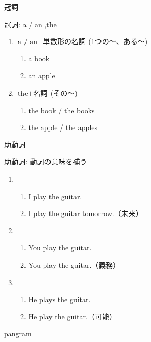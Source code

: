 \documentclass[aspectratio=169,xcolor={dvipsnames,table}]{beamer}
\begin{document}
\begin{frame}[plain]{冠詞}
\Large

冠詞: a / an ,\hspace{10pt}the

 \begin{enumerate}
  \item $\text{a / an} + \text{単数形の名詞}$\,(1つの～、ある～)
	\begin{enumerate}
	 \item a book\hfill\textipa{/\textschwa /}
	 \item an apple\hfill{}
	\end{enumerate}
  \item $\text{the} + \text{名詞}$\,(その～)\hspace{10pt}{\small (単数形・複数形どちらにもつく)}
	\begin{enumerate}
	 \item the book / the books\hfill\textipa{/\dh\textschwa/}
	 \item the apple / the apples\hfill{}
	\end{enumerate}
 \end{enumerate}
\mbox{}\hfill{\scriptsize {}}
\end{frame}
\begin{frame}[plain]{助動詞}
 \Large

助動詞: 動詞の意味を補う

\begin{enumerate}
 \item \begin{enumerate}
	\item<1-> I play the guitar.
	\item<2-> I  play the guitar tomorrow.（未来）
       \end{enumerate}
 \item \begin{enumerate}
	\item<3-> You play the guitar.
	\item<4-> You  play the guitar.（義務）
       \end{enumerate}
 \item \begin{enumerate}
	\item<5-> He plays the guitar.
	\item<6-> He  play the guitar.（可能）
       \end{enumerate}
\end{enumerate}
\mbox{}\hfill{\scriptsize {}}
\end{frame}
\begin{frame}[plain]{pangram}
 \pangram
\end{frame}
\end{document}
